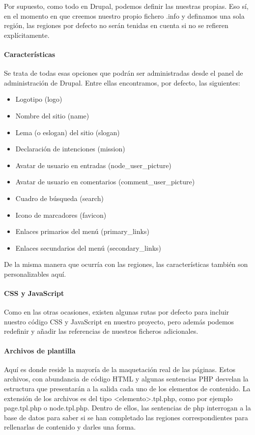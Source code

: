 \par Por supuesto, como todo en Drupal, podemos definir las nuestras propias. Eso sí, en el momento en que creemos nuestro propio fichero .info y definamos una sola región, las regiones por defecto no serán tenidas en cuenta si no se refieren explícitamente.

\paragraph{Características}
\par Se trata de todas esas opciones que podrán ser administradas desde el panel de administración de Drupal. Entre ellas encontramos, por defecto, las siguientes:

\begin{itemize}
\item Logotipo (logo)
\item Nombre del sitio (name)
\item Lema (o eslogan) del sitio (slogan)
\item Declaración de intenciones (mission)
\item Avatar de usuario en entradas (node\_user\_picture)
\item Avatar de usuario en comentarios (comment\_user\_picture)
\item Cuadro de búsqueda (search)
\item Icono de marcadores (favicon)
\item Enlaces primarios del menú (primary\_links)
\item Enlaces secundarios del menú (secondary\_links)
\end{itemize}

\par De la misma manera que ocurría con las regiones, las características también son personalizables aquí.

\paragraph{CSS y JavaScript}
\par Como en las otras ocasiones, existen algunas rutas por defecto para incluir nuestro código CSS y JavaScript en nuestro proyecto, pero además podemos redefinir y añadir las referencias de nuestros ficheros adicionales.

\paragraph{Archivos de plantilla}
\par Aquí es donde reside la mayoría de la maquetación real de las páginas. Estos archivos, con abundancia de código HTML y algunas sentencias PHP desvelan la estructura que presentarán a la salida cada uno de los elementos de contenido. La extensión de los archivos es del tipo <elemento>.tpl.php, como por ejemplo page.tpl.php o node.tpl.php. Dentro de ellos, las sentencias de php interrogan a la base de datos para saber si se han completado las regiones correspondientes para rellenarlas de contenido y darles una forma.


